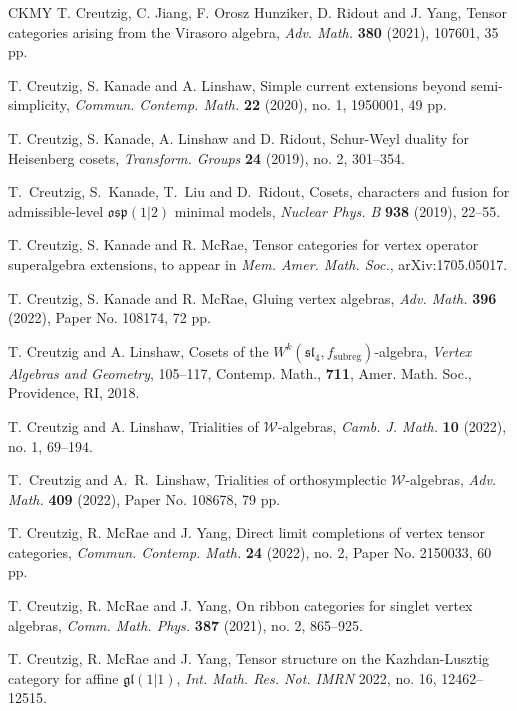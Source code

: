 \documentclass[11pt, reqno]{amsart}
\theoremstyle{definition}\newtheorem{defi}[thm]{Definition}
\theoremstyle{definition}\newtheorem{rem}[thm]{Remark}
\theoremstyle{definition}\newtheorem{exam}[thm]{Example}
\theoremstyle{definition}\newtheorem{assum}[thm]{Assumption}
\begin{document}
\begin{thebibliography}{CKMY}
T. Creutzig, C. Jiang, F. Orosz Hunziker, D. Ridout and J. Yang, Tensor categories arising from the Virasoro algebra, \textit{Adv. Math.} \textbf{380} (2021), 107601, 35 pp.

 T. Creutzig, S. Kanade and A. Linshaw, Simple current extensions beyond semi-simplicity, \textit{Commun. Contemp. Math.} \textbf{22} (2020), no. 1, 1950001, 49 pp.

T. Creutzig, S. Kanade, A. Linshaw and D. Ridout, Schur-Weyl duality for Heisenberg cosets, {\em Transform. Groups} \textbf{24} (2019), no. 2, 301--354.

T.~Creutzig, S.~Kanade, T.~Liu and D.~Ridout,
Cosets, characters and fusion for admissible-level $\mathfrak{osp}(1 \vert 2)$ minimal models, \textit{Nuclear Phys. B} \textbf{938} (2019), 22--55.

T. Creutzig, S. Kanade and R. McRae, Tensor categories for vertex operator superalgebra extensions, to appear in \textit{Mem. Amer. Math. Soc.}, arXiv:1705.05017.

T. Creutzig, S. Kanade and R. McRae, Gluing vertex algebras, \textit{Adv. Math.} \textbf{396} (2022), Paper No. 108174, 72 pp.

T. Creutzig and A. Linshaw, Cosets of the $W^k(\mathfrak{sl}_4,f_{\text{subreg}})$-algebra, \textit{Vertex Algebras and Geometry}, 105--117, Contemp. Math., \textbf{711}, Amer. Math. Soc., Providence, RI, 2018.

T. Creutzig and A. Linshaw, Trialities of $\mathcal{W}$-algebras, \textit{Camb. J. Math.} \textbf{10} (2022), no. 1, 69--194.

T.~Creutzig and A.~R.~Linshaw, Trialities of orthosymplectic $\mathcal{W}$-algebras, \textit{Adv. Math.} \textbf{409} (2022), Paper No. 108678, 79 pp.

T. Creutzig, R. McRae and J. Yang, Direct limit completions of vertex tensor categories, \textit{Commun. Contemp. Math.} \textbf{24} (2022), no. 2, Paper No. 2150033, 60 pp. 

T. Creutzig, R. McRae and J. Yang, On ribbon categories for singlet vertex algebras, \textit{Comm. Math. Phys.} \textbf{387} (2021),  no. 2, 865--925.

T. Creutzig, R. McRae and J. Yang, Tensor structure on the Kazhdan-Lusztig category for affine $\mathfrak{gl}(1|1)$, \textit{Int. Math. Res. Not. IMRN} 2022, no. 16, 12462--12515.


\end{thebibliography}
\end{document}
